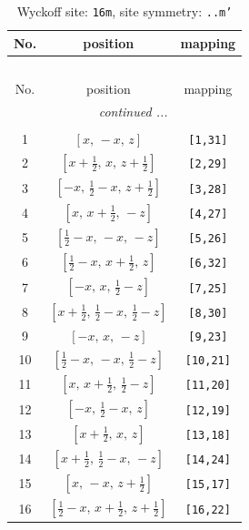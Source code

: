 \documentclass[fleqn,8pt]{jsarticle}
\begin{document}
\renewcommand{\arraystretch}{1.2}
\begin{longtable}{ccc}
\caption{Wyckoff site: {\tt 16m}, site symmetry: {\tt ..m'}}
 \\
 \hline \hline
No. & position & mapping \\ \hline \endfirsthead

\multicolumn{2}{l}{\tablename\ \thetable{}} \\
 \hline \hline
No. & position & mapping \\ \hline \endhead

 \hline \hline
\multicolumn{2}{r}{\footnotesize\it continued ...} \\ \endfoot

 \hline \hline
\multicolumn{2}{r}{} \\ \endlastfoot

1 & $\left[ x,\, - x,\, z \right]$ & {\tt [1,31]} \\ \hline
2 & $\left[ x + \frac{1}{2},\, x,\, z + \frac{1}{2} \right]$ & {\tt [2,29]} \\ \hline
3 & $\left[ - x,\, \frac{1}{2} - x,\, z + \frac{1}{2} \right]$ & {\tt [3,28]} \\ \hline
4 & $\left[ x,\, x + \frac{1}{2},\, - z \right]$ & {\tt [4,27]} \\ \hline
5 & $\left[ \frac{1}{2} - x,\, - x,\, - z \right]$ & {\tt [5,26]} \\ \hline
6 & $\left[ \frac{1}{2} - x,\, x + \frac{1}{2},\, z \right]$ & {\tt [6,32]} \\ \hline
7 & $\left[ - x,\, x,\, \frac{1}{2} - z \right]$ & {\tt [7,25]} \\ \hline
8 & $\left[ x + \frac{1}{2},\, \frac{1}{2} - x,\, \frac{1}{2} - z \right]$ & {\tt [8,30]} \\ \hline
9 & $\left[ - x,\, x,\, - z \right]$ & {\tt [9,23]} \\ \hline
10 & $\left[ \frac{1}{2} - x,\, - x,\, \frac{1}{2} - z \right]$ & {\tt [10,21]} \\ \hline
11 & $\left[ x,\, x + \frac{1}{2},\, \frac{1}{2} - z \right]$ & {\tt [11,20]} \\ \hline
12 & $\left[ - x,\, \frac{1}{2} - x,\, z \right]$ & {\tt [12,19]} \\ \hline
13 & $\left[ x + \frac{1}{2},\, x,\, z \right]$ & {\tt [13,18]} \\ \hline
14 & $\left[ x + \frac{1}{2},\, \frac{1}{2} - x,\, - z \right]$ & {\tt [14,24]} \\ \hline
15 & $\left[ x,\, - x,\, z + \frac{1}{2} \right]$ & {\tt [15,17]} \\ \hline
16 & $\left[ \frac{1}{2} - x,\, x + \frac{1}{2},\, z + \frac{1}{2} \right]$ & {\tt [16,22]} \\
\end{longtable}
\end{document}
